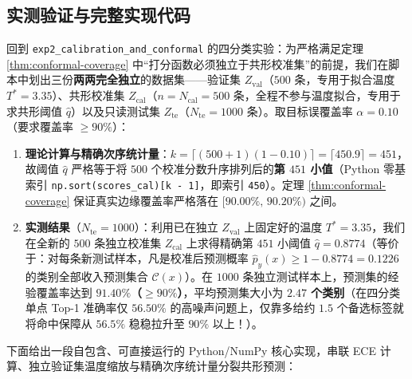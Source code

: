 \subsection{实测验证与完整实现代码}

回到 \texttt{exp2\_calibration\_and\_conformal} 的四分类实验：为严格满足定理 \ref{thm:conformal-coverage} 中“打分函数必须独立于共形校准集”的前提，我们在脚本中划出三份\textbf{两两完全独立}的数据集——验证集 $Z_{\text{val}}$（$500$ 条，专用于拟合温度 $T^* = 3.35$）、共形校准集 $Z_{\text{cal}}$（$n = N_{\text{cal}} = 500$ 条，全程不参与温度拟合，专用于求共形阈值 $\hat{q}$）以及只读测试集 $Z_{\text{te}}$（$N_{\text{te}} = 1000$ 条）。取目标误覆盖率 $\alpha = 0.10$（要求覆盖率 $\ge 90\%$）：
\begin{enumerate}
  \item \textbf{理论计算与精确次序统计量}：$k = \lceil (500 + 1)(1 - 0.10) \rceil = \lceil 450.9 \rceil = 451$，故阈值 $\hat{q}$ 严格等于将 $500$ 个校准分数升序排列后的\textbf{第 $451$ 小值}（Python 零基索引 \texttt{np.sort(scores\_cal)[k - 1]}，即索引 \texttt{450}）。定理 \ref{thm:conformal-coverage} 保证真实边缘覆盖率严格落在 $[90.00\%,\, 90.20\%)$ 之间。
  \item \textbf{实测结果}（$N_{\text{te}} = 1000$）：利用已在独立 $Z_{\text{val}}$ 上固定好的温度 $T^* = 3.35$，我们在全新的 $500$ 条独立校准集 $Z_{\text{cal}}$ 上求得精确第 $451$ 小阈值 \textbf{$\hat{q} = 0.8774$}（等价于：对每条新测试样本，凡是校准后预测概率 $\hat{p}_y(x) \ge 1 - 0.8774 = 0.1226$ 的类别全部收入预测集合 $\mathcal{C}(x)$）。在 $1000$ 条独立测试样本上，预测集的经验覆盖率达到 \textbf{$91.40\%$（$\ge 90\%$）}，平均预测集大小为 \textbf{$2.47$ 个类别}（在四分类单点 Top-1 准确率仅 $56.50\%$ 的高噪声问题上，仅靠多给约 $1.5$ 个备选标签就将命中保障从 $56.5\%$ 稳稳拉升至 $90\%$ 以上！）。
\end{enumerate}

下面给出一段自包含、可直接运行的 Python/NumPy 核心实现，串联 ECE 计算、独立验证集温度缩放与精确次序统计量分裂共形预测：

